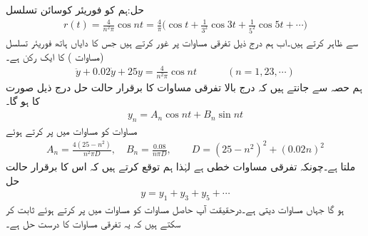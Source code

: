 حل:ہم  کو فوریئر کوسائن تسلسل
\begin{align}\label{مساوات_فوریئر_جبری_ارتعاش_مثال_ب}
r(t)=\frac{4}{n^2\pi}\cos nt=\frac{4}{\pi} \big(\cos t+\frac{1}{3^2}\cos 3t+\frac{1}{5^2}\cos 5t+\cdots\big)
\end{align}
سے ظاہر کرتے ہیں۔اب ہم درج ذیل تفرقی مساوات پر غور کرتے ہیں جس کا دایاں ہاتھ فوریئر تسلسل (مساوات ) کا ایک رکن ہے۔
\begin{align}\label{مساوات_فوریئر_جبری_ارتعاش_مثال_پ}
\ddot{y}+0.02\dot{y}+25y=\frac{4}{n^2\pi}\cos nt\quad \quad \quad (n=1,23,\cdots)
\end{align}
ہم حصہ  سے جانتے ہیں کہ درج بالا تفرقی مساوات کا برقرار حالت حل درج ذیل صورت کا ہو گا۔
\begin{align}\label{مساوات_فوریئر_جبری_ارتعاش_مثال_ت}
y_n=A_n\cos nt+B_n\sin nt
\end{align}
مساوات  کو مساوات  میں پر کرتے ہوئے
\begin{align}\label{مساوات_فوریئر_جبری_ارتعاش_مثال_ٹ}
A_n=\frac{4(25-n^2)}{n^2\pi D}, \quad B_n=\frac{0.08}{n\pi D}, \quad  \quad D=(25-n^2)^2+(0.02n)^2
\end{align}
ملتا ہے۔چونکہ تفرقی مساوات  خطی ہے لہٰذا ہم توقع کرتے ہیں کہ اس کا برقرار حالت حل 
\begin{align}\label{مساوات_فوریئر_جبری_ارتعاش_مثال_ث}
y=y_1+y_3+y_5+\cdots
\end{align}
ہو گا جہاں مساوات   دیتی ہے۔درحقیقت آپ حاصل مساوات  کو مساوات  میں پر کرتے ہوئے ثابت کر سکتے ہیں کہ یہ تفرقی مساوات کا درست حل ہے۔

